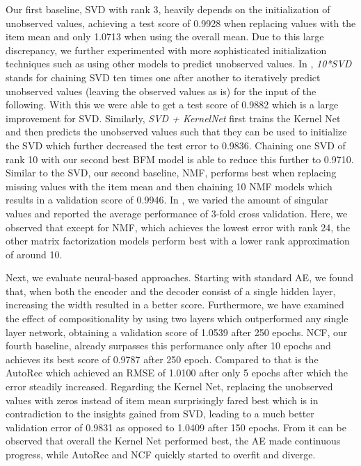 \documentclass[10pt,conference,compsocconf]{IEEEtran}
\begin{document}
    Our first baseline, SVD with rank 3, heavily depends on the initialization of unobserved values, achieving a test score of 0.9928 when replacing values with the item mean and only 1.0713 when using the overall mean.
    Due to this large discrepancy, we further experimented with more sophisticated initialization techniques such as using other models to predict unobserved values.
    In , \textit{10*SVD} stands for chaining SVD ten times one after another to iteratively predict unobserved values (leaving the observed values as is) for the input of the following.
    With this we were able to get a test score of 0.9882 which is a large improvement for SVD.
    Similarly, \textit{SVD + KernelNet} first trains the Kernel Net and then predicts the unobserved values such that they can be used to initialize the SVD which further decreased the test error to 0.9836.
    Chaining one SVD of rank 10 with our second best BFM model is able to reduce this further to 0.9710.
    Similar to the SVD, our second baseline, NMF, performs best when replacing missing values with the item mean and then chaining 10 NMF models which results in a validation score of 0.9946.
    In , we varied the amount of singular values and reported the average performance of 3-fold cross validation.
    Here, we observed that except for NMF, which achieves the lowest error with rank 24, the other matrix factorization models perform best with a lower rank approximation of around 10.

    Next, we evaluate neural-based approaches.
    Starting with standard AE, we found that, when both the encoder and the decoder consist of a single hidden layer, increasing the width resulted in a better score.
    Furthermore, we have examined the effect of compositionality by using two layers which outperformed any single layer network, obtaining a validation score of 1.0539 after 250 epochs.
    NCF, our fourth baseline, already surpasses this performance only after 10 epochs and achieves its best score of 0.9787 after 250 epoch.
    Compared to that is the AutoRec which achieved an RMSE of 1.0100 after only 5 epochs after which the error steadily increased.
    Regarding the Kernel Net, replacing the unobserved values with zeros instead of item mean surprisingly fared best which is in contradiction to the insights gained from SVD, leading to a much better validation error of 0.9831 as opposed to 1.0409 after 150 epochs.
    From  it can be observed that overall the Kernel Net performed best, the AE made continuous progress, while AutoRec and NCF quickly started to overfit and diverge.
\end{document}
